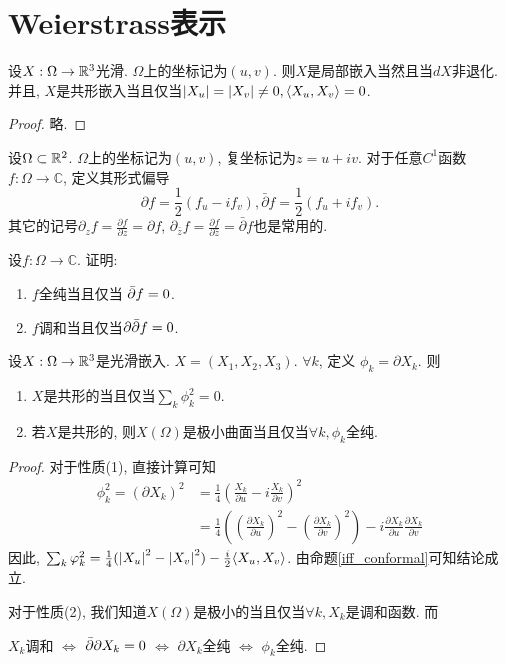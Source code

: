 \section{Weierstrass表示}
\begin{proposition} \label{iff_conformal}
    设$X: \Omega \to \mathbb{R}^3$光滑. $\Omega$上的坐标记为$(u,v)$. 则$X$是局部嵌入当然且当$dX$非退化. 并且, $X$是共形嵌入当且仅当$\left | X_u \right |=\left | X_v \right | \ne 0, {\left < X_u, X_v \right >} =0$.
\end{proposition}
\begin{proof}
    略.
\end{proof}
\begin{definition}
    设$\Omega \subset \mathbb{R}^2$.   $\Omega$上的坐标记为$(u,v)$, 复坐标记为$z=u+iv$. 对于任意$C^1$函数$f: \Omega \to \mathbb{C}$, 定义其形式偏导
    \begin{equation}
        \partial f= \frac{1}{2}(f_u- i f_v), \bar{\partial} f= \frac{1}{2}(f_u+i f_v).
    \end{equation}
    其它的记号$\partial_{z}f=\frac{\partial f}{\partial z} =\partial f$, $\partial_{\bar{z}}f=\frac{\partial f}{\partial \bar{z}} =\bar{\partial} f$也是常用的.
\end{definition}
\begin{exercise}
    设$f: \Omega \to \mathbb{C}$. 证明:
    \begin{enumerate}
        \item $f$全纯当且仅当 ${\bar{\partial}} f=0$.
        \item $f$调和当且仅当$\partial {\bar{\partial}} f=0$.
    \end{enumerate}
\end{exercise}
\begin{proposition} \label{iff_conformal_c}
    设$X: \Omega \to \mathbb{R}^3$是光滑嵌入. $X=(X_1,X_2,X_3)$. $\forall k$, 定义 $\phi_k= \partial X_k$. 则
    \begin{enumerate}
        \item $X$是共形的当且仅当$\sum_k \phi_k^2=0$.
        \item 若$X$是共形的, 则$X(\Omega)$是极小曲面当且仅当$\forall k, \phi_k$全纯.
    \end{enumerate}
\end{proposition}
\begin{proof}
    对于性质(1), 直接计算可知
    \begin{equation}
        \begin{split}
            \phi_k^2=(\partial X_k)^2 &= \frac{1}{4}(\frac{X_k}{\partial u} - i \frac{X_k}{\partial v})^2\\
             &= \frac{1}{4}((\frac{\partial X_k}{\partial u})^2- (\frac{\partial X_k}{\partial v})^2) - i \frac{\partial X_k}{\partial u} \frac{\partial X_k}{\partial v}
        \end{split}
    \end{equation}
    因此,  $\sum_k \varphi_k^2= \frac{1}{4}(\left | X_u \right |^2- \left | X_v \right |^2)-\frac{i}{2} {\left < X_u, X_v \right >}$. 由命题\eqref{iff_conformal}可知结论成立.
    \par 对于性质(2), 我们知道$X(\Omega)$是极小的当且仅当$\forall k, X_k$是调和函数. 而
    \par $X_k$调和 $\iff$ ${\bar{\partial}} \partial X_k=0$ $\iff$ $\partial X_k$全纯 $\iff$ $\phi_k$全纯.
\end{proof}
